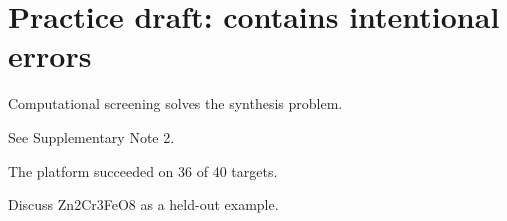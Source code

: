 \documentclass{article}
\begin{document}
\section*{Practice draft: contains intentional errors}
Computational screening solves the synthesis problem.

See Supplementary Note 2.

The platform succeeded on 36 of 40 targets.

Discuss Zn2Cr3FeO8 as a held-out example.
\end{document}
